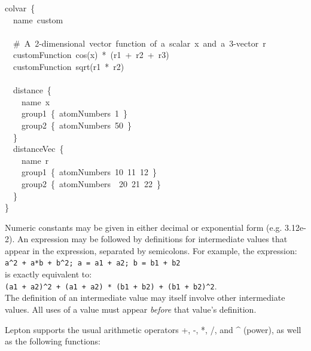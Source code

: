 {\begin{cvexampleinput}
\-colvar~\{\\
\-~~name~custom\\
\\
\-~~\#~A~2-dimensional~vector~function~of~a~scalar~x~and~a~3-vector~r\\
\-~~customFunction~cos(x)~*~(r1~+~r2~+~r3)\\
\-~~customFunction~sqrt(r1~*~r2)\\
\\
\-~~distance~\{\\
\-~~~~name~x\\
\-~~~~group1~\{~atomNumbers~1~\}\\
\-~~~~group2~\{~atomNumbers~50~\}\\
\-~~\}\\
\-~~distanceVec~\{\\
\-~~~~name~r\\
\-~~~~group1~\{~atomNumbers~10~11~12~\}\\
\-~~~~group2~\{~atomNumbers~~20~21~22~\}\\
\-~~\}\\
\}
\end{cvexampleinput}

Numeric constants may be given in either decimal or exponential form (e.g. 3.12e-2).
An expression may be followed by definitions for intermediate values that
appear in the expression, separated by semicolons.
For example, the expression:\\
\texttt{a\^{}2 + a*b + b\^{}2; a = a1 + a2; b = b1 + b2}\\
is exactly equivalent to:\\
\texttt{(a1 + a2)\^{}2 + (a1 + a2) * (b1 + b2) + (b1 + b2)\^{}2}.\\
The definition of an intermediate value may itself involve other intermediate values.
All uses of a value must appear \textit{before} that value's definition.

Lepton supports the usual arithmetic operators +, -, *, /, and \^{} (power), as well as the following functions:

}
